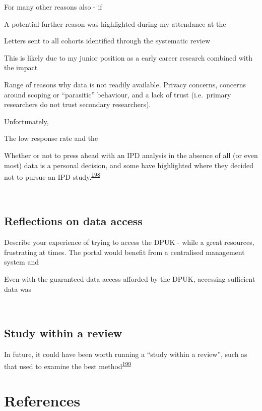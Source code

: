 \documentclass[a4paper, twoside]{templates/ociamthesis}
\begin{document}
For many other reasons also - if

A potential further reason was highlighted during my attendance at the

Letters sent to all cohorts identified through the systematic review

This is likely due to my junior position as a early career research combined with the impact

Range of reasons why data is not readily available. Privacy concerns, concerns around scoping or ``parasitic'' behaviour, and a lack of trust (i.e.~primary researchers do not trust secondary researchers).

Unfortunately,

The low response rate and the

Whether or not to press ahead with an IPD analysis in the absence of all (or even most) data is a personal decision, and some have highlighted where they decided not to pursue an IPD study.\textsuperscript{\protect\hyperlink{ref-jaspers2014}{198}}

~

\hypertarget{reflections-on-data-access}{%
\subsection{Reflections on data access}\label{reflections-on-data-access}}

Describe your experience of trying to access the DPUK - while a great resources, frustrating at times. The portal would benefit from a centralised management system and

Even with the guaranteed data access afforded by the DPUK, accessing sufficient data was

~

\hypertarget{study-within-a-review}{%
\subsection{Study within a review}\label{study-within-a-review}}

In future, it could have been worth running a ``study within a review'', such as that used to examine the best method\textsuperscript{\protect\hyperlink{ref-godolphin2019a}{199}}

\newpage

\hypertarget{references-4}{%
\section{References}\label{references-4}}
\end{document}
